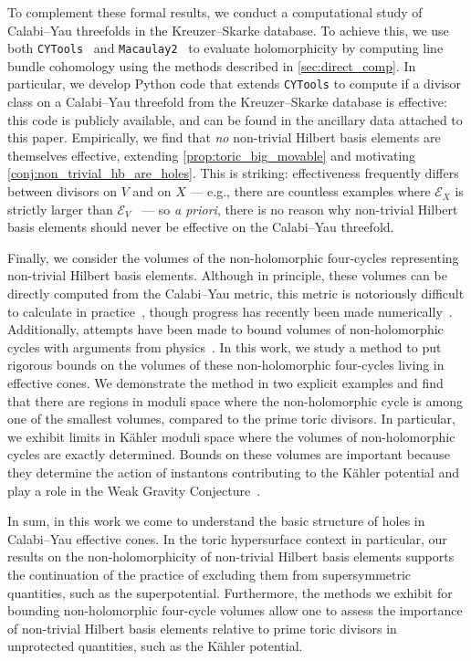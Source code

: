 \documentclass[11pt,dvipsnames]{article}
\theoremstyle{definition}
\begin{document}
To complement these formal results, we conduct a computational study of Calabi--Yau threefolds in the Kreuzer--Skarke database. To achieve this, we use both \verb+CYTools+~\cite{Demirtas:2022hqf} and \verb+Macaulay2+~\cite{M2} to evaluate holomorphicity by computing line bundle cohomology using the methods described in \cref{sec:direct_comp}. In particular, we develop Python code that extends \verb+CYTools+ to compute if a divisor class on a Calabi--Yau threefold from the Kreuzer--Skarke database is effective: this code is publicly available, and can be found in the ancillary data attached to this paper. Empirically, we find that \textit{no} non-trivial Hilbert basis elements are themselves effective, extending \cref{prop:toric_big_movable} and motivating \cref{conj:non_trivial_hb_are_holes}. This is striking: effectiveness frequently differs between divisors on $V$ and on $X$ --- e.g., there are countless examples where $\mathcal{E}_X$ is strictly larger than $\mathcal{E}_V$~\cite{Demirtas:2018akl} --- so \textit{a priori}, there is no reason why non-trivial Hilbert basis elements should never be effective on the Calabi--Yau threefold.

Finally, we consider the volumes of the non-holomorphic four-cycles representing non-trivial Hilbert basis elements. Although in principle, these volumes can be directly computed from the Calabi--Yau metric, this metric is notoriously difficult to calculate in practice~\cite{Yau1978,Yau1990,Yau1991}, though progress has recently been made numerically~\cite{Ashmore:2019wzb, Douglas:2020hpv, Larfors:2021pbb, Gerdes:2022nzr, Butbaia:2024xgj}. Additionally, attempts have been made to bound volumes of non-holomorphic cycles with arguments from physics~\cite{Demirtas:2019lfi, Long:2021lon}. In this work, we study a method to put rigorous bounds on the volumes of these non-holomorphic four-cycles living in effective cones. We demonstrate the method in two explicit examples and find that there are regions in moduli space where the non-holomorphic cycle is among one of the smallest volumes, compared to the prime toric divisors. In particular, we exhibit limits in K\"ahler moduli space where the volumes of non-holomorphic cycles are exactly determined. Bounds on these volumes are important because they determine the action of instantons contributing to the K\"ahler potential and play a role in the Weak Gravity Conjecture~\cite{Arkani-Hamed:2006emk}.

In sum, in this work we come to understand the basic structure of holes in Calabi--Yau effective cones. In the toric hypersurface context in particular, our results on the non-holomorphicity of non-trivial Hilbert basis elements supports the continuation of the practice of excluding them from supersymmetric quantities, such as the superpotential. Furthermore, the methods we exhibit for bounding non-holomorphic four-cycle volumes allow one to assess the importance of non-trivial Hilbert basis elements relative to prime toric divisors in unprotected quantities, such as the K\"ahler potential.
\end{document}
